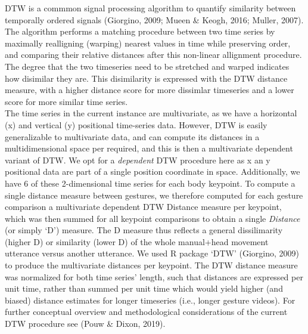 \documentclass[
  man, noextraspace,floatsintext]{apa6}
\begin{document}
DTW is a commmon signal processing algorithm to quantify similarity between temporally ordered signals (Giorgino, 2009; Mueen \& Keogh, 2016; Muller, 2007). The algorithm performs a matching procedure between two time series by maximally realligning (warping) nearest values in time while preserving order, and comparing their relative distances after this non-linear allignment procedure. The degree that the two timeseries need to be stretched and warped indicates how disimilar they are. This disimilarity is expressed with the DTW distance measure, with a higher distance score for more dissimlar timeseries and a lower score for more similar time series.\\
The time series in the current instance are multivariate, as we have a horizontal (x) and vertical (y) positional time-series data. However, DTW is easily generalizable to multivariate data, and can compute its distances in a multidimensional space per required, and this is then a multivariate dependent variant of DTW. We opt for a \emph{dependent} DTW procedure here as x an y positional data are part of a single position coordinate in space. Additionally, we have 6 of these 2-dimensional time series for each body keypoint. To compute a single distance measure between gestures, we therefore computed for each gesture comparison a multivariate dependent DTW Distance measure per keypoint, which was then summed for all keypoint comparisons to obtain a single \emph{Distance} (or simply `D') measure. The D measure thus reflects a general dissilimarity (higher D) or similarity (lower D) of the whole manual+head movement utterance versus another utterance.
We used R package `DTW' (Giorgino, 2009) to produce the multivariate distances per keypoint. The DTW distance measure was normalized for both time series' length, such that distances are expressed per unit time, rather than summed per unit time which would yield higher (and biased) distance estimates for longer timeseries (i.e., longer gesture videos). For further conceptual overview and methodological considerations of the current DTW procedure see (Pouw \& Dixon, 2019).
\end{document}
